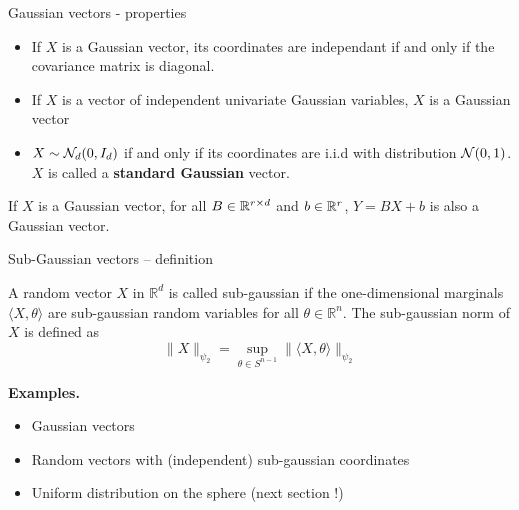 \documentclass{beamer}
\begin{document}
  \begin{frame}{Gaussian vectors - properties}

    \begin{corollary}
      \begin{itemize}
      \item If $X$ is a Gaussian vector, its coordinates are independant if and only if
        the covariance matrix is diagonal.

        \pause

      \item If $X$ is a vector of independent univariate
        Gaussian variables, $X$ is a Gaussian vector

        \pause

      \item  $X \sim \mathcal{N}_d(0,I_d)$ if and only if its coordinates are i.i.d with
        distribution $\mathcal{N}(0,1)$. $X$ is called a \textbf{standard Gaussian}
        vector.

      \end{itemize}
    \end{corollary}

    \pause

    \begin{proposition}
      If $X$ is a Gaussian vector, for all $B \in \mathbb{R}^{r \times d}$ and $b
      \in \mathbb{R}^r$, $Y = BX + b$ is also a Gaussian vector.
    \end{proposition}

  \end{frame}

  \begin{frame}{Sub-Gaussian vectors -- definition}
    \begin{definition} A random vector $X$ in
      $\mathbb{R}^{d}$ is called sub-gaussian if the one-dimensional marginals
      $\langle X, \theta \rangle$ are sub-gaussian random variables for all $\theta \in \mathbb{R}^{n} .$ The sub-gaussian norm of $X$ is defined as
      $$
      \|X\|_{\psi_{2}}=\sup _{\theta \in S^{n-1}}\|\langle X, \theta\rangle\|_{\psi_{2}}
      $$

    \end{definition}

    \textbf{Examples.}
    
    \begin{itemize}
    \item Gaussian vectors
    \item Random vectors with (independent) sub-gaussian coordinates
    \item Uniform distribution on the sphere (next section !)
    \end{itemize}
  \end{frame}
\end{document}

